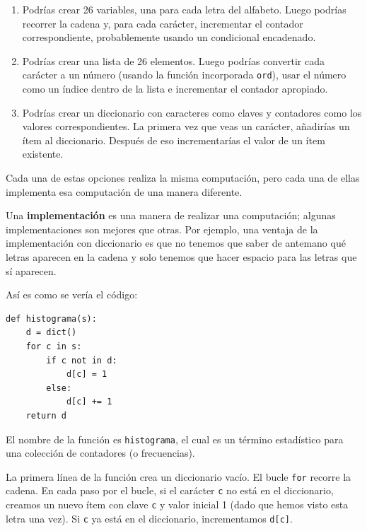 \documentclass[10pt]{book}
\begin{document}
\begin{enumerate}

\item Podrías crear 26 variables, una para cada letra del
alfabeto.  Luego podrías recorrer la cadena y, para cada
carácter, incrementar el contador correspondiente, probablemente usando
un condicional encadenado.

\item Podrías crear una lista de 26 elementos.  Luego podrías
convertir cada carácter a un número (usando la función incorporada
{\tt ord}), usar el número como un índice dentro de la lista e incrementar
el contador apropiado.

\item Podrías crear un diccionario con caracteres como claves
y contadores como los valores correspondientes.  La primera vez que
veas un carácter, añadirías un ítem al diccionario.  Después
de eso incrementarías el valor de un ítem existente.

\end{enumerate}

Cada una de estas opciones realiza la misma computación, pero cada una
de ellas implementa esa computación de una manera diferente.

Una {\bf implementación} es una manera de realizar una computación;
algunas implementaciones son mejores que otras.  Por ejemplo,
una ventaja de la implementación con diccionario es que no
tenemos que saber de antemano qué letras aparecen en la cadena
y solo tenemos que hacer espacio para las letras que sí aparecen.

Así es como se vería el código:

\begin{verbatim}
def histograma(s):
    d = dict()
    for c in s:
        if c not in d:
            d[c] = 1
        else:
            d[c] += 1
    return d
\end{verbatim}
%
El nombre de la función es {\tt histograma}, el cual es un término
estadístico para una colección de contadores (o frecuencias).

La primera línea de la
función crea un diccionario vacío.  El bucle {\tt for} recorre
la cadena.  En cada paso por el bucle, si el carácter {\tt c} no
está en el diccionario, creamos un nuevo ítem con clave {\tt c} y
valor inicial 1 (dado que hemos visto esta letra una vez).  Si {\tt c}
ya está en el diccionario, incrementamos {\tt d[c]}.
\end{document}
